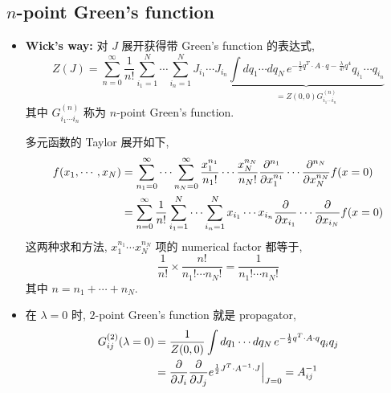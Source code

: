 \subsection{\texorpdfstring{$n$}{n}-point Green's function}
\begin{itemize}
	\item \textbf{Wick's way:} 对 $J$ 展开获得带 Green's function 的表达式,
	\begin{equation}
		Z(J) = \sum_{n = 0}^\infty \frac{1}{n!} \sum_{i_1 = 1}^N \cdots \sum_{i_n = 1}^N J_{i_1} \cdots J_{i_n} \underbrace{\int dq_1 \cdots dq_N \, e^{- \frac{1}{2} q^T \cdot A \cdot q - \frac{\lambda}{4!} q^4} q_{i_1} \cdots q_{i_n}}_{= Z(0, 0) G^{(n)}_{i_1 \cdots i_n}}
	\end{equation}
	其中 $G^{(n)}_{i_1 \cdots i_n}$ 称为 $n$-point Green's function.
	
	\begin{tcolorbox}[title=Taylor expansion:]
		多元函数的 Taylor 展开如下,
		\begin{align}
			f(x_1, \cdots, x_N) &= \sum_{n_1 = 0}^\infty \cdots \sum_{n_N = 0}^\infty \frac{x_1^{n_1}}{n_1 !} \cdots \frac{x_N^{n_N}}{n_N !} \frac{\partial^{n_1}}{\partial x_1^{n_1}} \cdots \frac{\partial^{n_N}}{\partial x_N^{n_N}} f(x = 0) \notag \\
			&= \sum_{n = 0}^\infty \frac{1}{n!} \sum_{i_1 = 1}^N \cdots \sum_{i_n = 1}^N x_{i_1} \cdots x_{i_n} \frac{\partial}{\partial x_{i_1}} \cdots \frac{\partial}{\partial x_{i_N}} f(x = 0)
		\end{align}
		这两种求和方法, $x_1^{n_1} \cdots x_N^{n_N}$ 项的 numerical factor 都等于,
		\begin{equation}
			\frac{1}{n!} \times \frac{n!}{n_1 ! \cdots n_N !} = \frac{1}{n_1 ! \cdots n_N !}
		\end{equation}
		其中 $n = n_1 + \cdots + n_N$.
	\end{tcolorbox}
	
	\item 在 $\lambda = 0$ 时, $2$-point Green's function 就是 propagator,
	\begin{align}
		G^{(2)}_{i j}(\lambda = 0) &= \frac{1}{Z(0, 0)} \int dq_1 \cdots dq_N \, e^{- \frac{1}{2} q^T \cdot A \cdot q} q_i q_j \notag \\
		&= \frac{\partial}{\partial J_i} \frac{\partial}{\partial J_j} e^{\frac{1}{2} J^T \cdot A^{- 1} \cdot J} \Big|_{J = 0} = A^{- 1}_{i j}
	\end{align}
	

\end{itemize}
